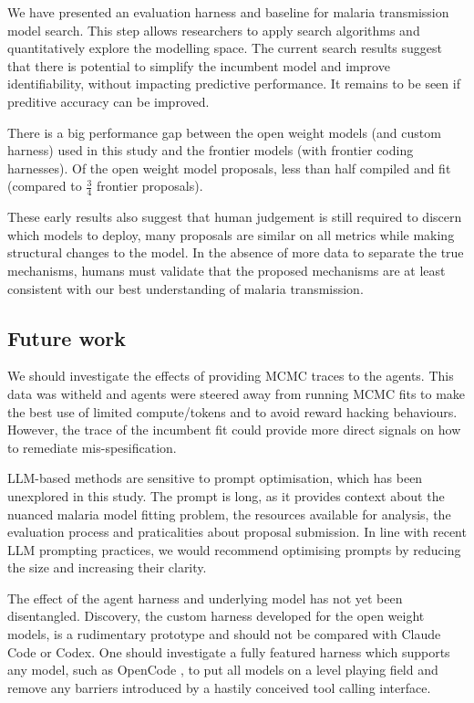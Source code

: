 \documentclass[11pt]{article}
\begin{document}
We have presented an evaluation harness and baseline for malaria transmission model search. This step allows researchers to apply search algorithms and quantitatively explore the modelling space. The current search results suggest that there is potential to simplify the incumbent model and improve identifiability, without impacting predictive performance. It remains to be seen if preditive accuracy can be improved.

There is a big performance gap between the open weight models (and custom harness) used in this study and the frontier models (with frontier coding harnesses). Of the open weight model proposals, less than half compiled and fit (compared to $\frac{3}{4}$ frontier proposals).

These early results also suggest that human judgement is still required to discern which models to deploy, many proposals are similar on all metrics while making structural changes to the model. In the absence of more data to separate the true mechanisms, humans must validate that the proposed mechanisms are at least consistent with our best understanding of malaria transmission.

\subsection{Future work}

We should investigate the effects of providing MCMC traces to the agents. This data was witheld and agents were steered away from running MCMC fits to make the best use of limited compute/tokens and to avoid reward hacking behaviours. However, the trace of the incumbent fit could provide more direct signals on how to remediate mis-spesification. 

LLM-based methods are sensitive to prompt optimisation, which has been unexplored in this study. The prompt is long, as it provides context about the nuanced malaria model fitting problem, the resources available for analysis, the evaluation process and praticalities about proposal submission. In line with recent LLM prompting practices, we would recommend optimising prompts by reducing the size and increasing their clarity.

The effect of the agent harness and underlying model has not yet been disentangled. Discovery, the custom harness developed for the open weight models, is a rudimentary prototype and should not be compared with Claude Code or Codex. One should investigate a fully featured harness which supports any model, such as OpenCode \citep{OpenCode}, to put all models on a level playing field and remove any barriers introduced by a hastily conceived tool calling interface.
\end{document}
